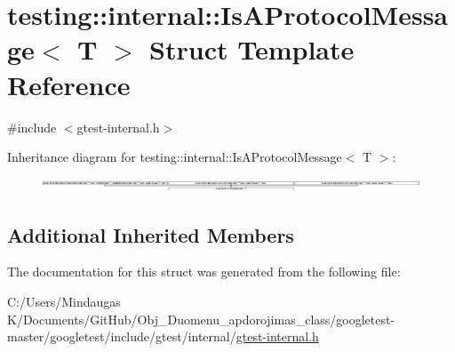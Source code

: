 \hypertarget{structtesting_1_1internal_1_1_is_a_protocol_message}{}\section{testing\+::internal\+::Is\+A\+Protocol\+Message$<$ T $>$ Struct Template Reference}
\label{structtesting_1_1internal_1_1_is_a_protocol_message}


{\ttfamily \#include $<$gtest-\/internal.\+h$>$}

Inheritance diagram for testing\+::internal\+::Is\+A\+Protocol\+Message$<$ T $>$\+:\begin{figure}[H]
\begin{center}
\leavevmode
\includegraphics[height=0.377486cm]{d9/de1/structtesting_1_1internal_1_1_is_a_protocol_message}
\end{center}
\end{figure}
\subsection*{Additional Inherited Members}


The documentation for this struct was generated from the following file\+:\begin{DoxyCompactItemize}
\item 
C\+:/\+Users/\+Mindaugas K/\+Documents/\+Git\+Hub/\+Obj\+\_\+\+Duomenu\+\_\+apdorojimas\+\_\+class/googletest-\/master/googletest/include/gtest/internal/\mbox{\hyperlink{googletest-master_2googletest_2include_2gtest_2internal_2gtest-internal_8h}{gtest-\/internal.\+h}}\end{DoxyCompactItemize}
